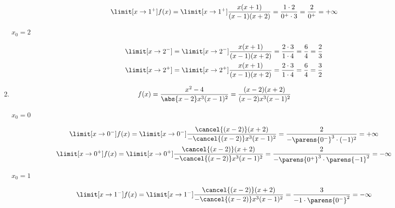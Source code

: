 \begin{enumerate}[label={\alph*)}]
    \item
        \begin{equation*}
            f(x) = \frac{x^2 - 4}{\abs{x - 2}x^3(x - 1)^2} = \frac{(x - 2)(x + 2)}{(x - 2)x^3(x - 1)^2}
        \end{equation*}
        \begin{description}
            \item[\(x_0 = 0\)]
                \begin{gather*}
                    \limit[x \to 0^-] f(x)
                        = \limit[x \to 0^-] \frac{\cancel{(x - 2)}(x + 2)}{-\cancel{(x - 2)}x^3(x - 1)^2}
                        = \frac{2}{-\parens{0^-}^3 \cdot (-1)^2}
                        = +\infty\\
                    \limit[x \to 0^+] f(x)
                        = \limit[x \to 0^+] \frac{\cancel{(x - 2)}(x + 2)}{-\cancel{(x - 2)}x^3(x - 1)^2}
                        = \frac{2}{-\parens{0^+}^3 \cdot \parens{-1}^2}
                        = -\infty
                \end{gather*}
            \item[\(x_0 = 1\)]
                \begin{gather*}
                    \limit[x \to 1^-] f(x)
                        = \limit[x \to 1^-] \frac{\cancel{(x - 2)}(x + 2)}{-\cancel{(x - 2)}x^3(x - 1)^2}
                        = \frac{3}{-1 \cdot \parens{0^-}^2}
                        = -\infty\\

\end{gather*}
\end{description}
\end{enumerate}
